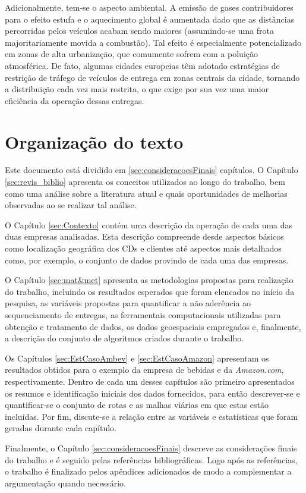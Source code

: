 Adicionalmente, tem-se o aspecto ambiental.
A emissão de gases contribuidores para o efeito estufa e o aquecimento global é aumentada dado que as distâncias percorridas pelos veículos acabam sendo maiores (assumindo-se uma frota majoritariamente movida a combustão).
Tal efeito é especialmente potencializado em zonas de alta urbanização, que comumente sofrem com a poluição atmosférica.
De fato, algumas cidades europeias têm adotado estratégias de restrição de tráfego de veículos de entrega em zonas centrais da cidade, tornando a distribuição cada vez mais restrita, o que exige por sua vez uma maior eficiência da operação dessas entregas.

\section{Organização do texto}

Este documento está dividido em \ref{sec:consideracoesFinais} capítulos.
O Capítulo \ref{sec:revis_biblio} apresenta os conceitos utilizados ao longo do trabalho, bem como uma análise sobre a literatura atual e quais oportunidades de melhorias observadas ao se realizar tal análise.

O Capítulo \ref{sec:Contexto} contém uma descrição da operação de cada uma das duas empresas analisadas.
Esta descrição compreende desde aspectos básicos como localização geográfica dos CDs e clientes até aspectos mais detalhados como, por exemplo, o conjunto de dados provindo de cada uma das empresas.

O Capítulo \ref{sec:mat&met} apresenta as metodologias propostas para realização do trabalho, incluindo os resultados esperados que foram elencados no início da pesquisa, as variáveis propostas para quantificar a não aderência ao sequenciamento de entregas, as ferramentais computacionais utilizadas para obtenção e tratamento de dados, os dados geoespaciais empregados e, finalmente, a descrição do conjunto de algoritmos criados durante o trabalho.

Os Capítulos \ref{sec:EstCasoAmbev} e \ref{sec:EstCasoAmazon}  apresentam os resultados obtidos para o exemplo da empresa de bebidas e da \textit{Amazon.com}, respectivamente.
Dentro de cada um desses capítulos são primeiro apresentados os resumos e identificação iniciais dos dados fornecidos, para então descrever-se e quantificar-se o conjunto de rotas e as malhas viárias em que estas estão incluídas. 
Por fim, discute-se a relação entre as variáveis e estatísticas que foram geradas durante cada capítulo.

Finalmente, o Capítulo \ref{sec:consideracoesFinais} descreve as considerações finais do trabalho e é seguido pelas referências bibliográficas.
Logo após as referências, o trabalho é finalizado pelos apêndices adicionados de modo a complementar a argumentação quando necessário.
